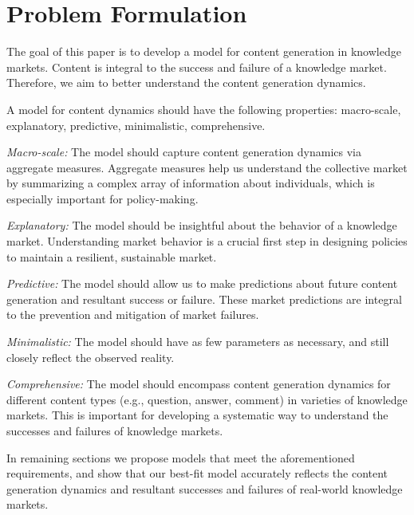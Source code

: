 \section{Problem Formulation} 
The goal of this paper is to develop a model for content generation in knowledge markets. Content is integral to the success and failure of a knowledge market. Therefore, we aim to better understand the content generation dynamics.

A model for content dynamics should have the following properties: macro-scale, explanatory, predictive, minimalistic, comprehensive.

\emph{Macro-scale:} The model should capture content generation dynamics via aggregate measures. Aggregate measures help us understand the collective market by summarizing a complex array of information about individuals, which is especially important for policy-making.

\emph{Explanatory:} The model should be insightful about the behavior of a knowledge market. Understanding market behavior is a crucial first step in designing policies to maintain a resilient, sustainable market.

\emph{Predictive:} The model should allow us to make predictions about future content generation and resultant success or failure. These market predictions are integral to the prevention and mitigation of market failures.

\emph{Minimalistic:} The model should have as few parameters as necessary, and still closely reflect the observed reality.

\emph{Comprehensive:} The model should encompass content generation dynamics for different content types (e.g., question, answer, comment) in varieties of knowledge markets. This is important for developing a systematic way to understand the successes and failures of knowledge markets.

In remaining sections we propose models that meet the aforementioned requirements, and show that our best-fit model accurately reflects the content generation dynamics and resultant successes and failures of real-world knowledge markets.
